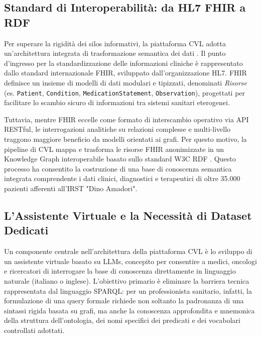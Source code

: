 \documentclass[12pt,a4paper,openright,twoside]{book}
\begin{document}
\subsection{Standard di Interoperabilità: da HL7 FHIR a RDF}
Per superare la rigidità dei silos informativi, la piattaforma CVL adotta
un'architettura integrata di trasformazione semantica dei dati
\cite{cvl2025pipeline}. Il punto d'ingresso per la standardizzazione delle
informazioni cliniche è rappresentato dallo standard internazionale \ac{FHIR},
sviluppato dall’organizzazione HL7. FHIR definisce un insieme di modelli di dati
modulari e tipizzati, denominati \textit{Risorse} (es. \texttt{Patient},
\texttt{Condition}, \texttt{MedicationStatement}, \texttt{Observation}),
progettati per facilitare lo scambio sicuro di informazioni tra sistemi sanitari
eterogenei.

Tuttavia, mentre FHIR eccelle come formato di interscambio operativo via API
RESTful, le interrogazioni analitiche su relazioni complesse e multi-livello
traggono maggiore beneficio da modelli orientati ai grafi. Per questo motivo, la
pipeline di CVL mappa e trasforma le risorse FHIR anonimizzate in un Knowledge
Graph interoperabile basato sullo standard W3C \ac{RDF} \cite{cvl2025pipeline}.
Questo processo ha consentito la costruzione di una base di conoscenza semantica
integrata comprendente i dati clinici, diagnostici e terapeutici di oltre 35.000
pazienti afferenti all'IRST "Dino Amadori".

\subsection{L'Assistente Virtuale e la Necessità di Dataset Dedicati}
Un componente centrale nell'architettura della piattaforma CVL è lo sviluppo di
un assistente virtuale basato su \acfp{LLM}, concepito per consentire a medici,
oncologi e ricercatori di interrogare la base di conoscenza direttamente in
linguaggio naturale (italiano o inglese). L'obiettivo primario è eliminare la
barriera tecnica rappresentata dal linguaggio SPARQL: per un professionista
sanitario, infatti, la formulazione di una query formale richiede non soltanto
la padronanza di una sintassi rigida basata su grafi, ma anche la conoscenza
approfondita e mnemonica della struttura dell'ontologia, dei nomi specifici dei
predicati e dei vocabolari controllati adottati.
\end{document}
